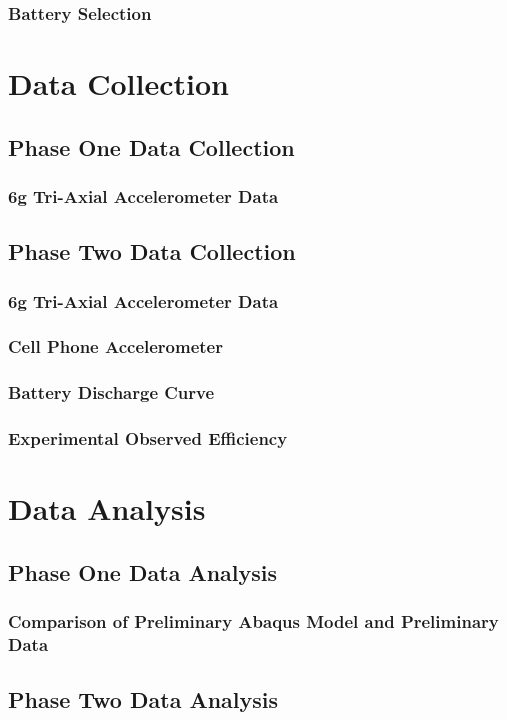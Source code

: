 \documentclass[12pt]{report}
\begin{document}
		\subsection{Battery Selection}
		
\chapter{Data Collection}
	\section{Phase One Data Collection}
		\subsection{6g Tri-Axial Accelerometer Data}
	\section{Phase Two Data Collection}
		\subsection{6g Tri-Axial Accelerometer Data}
		\subsection{Cell Phone Accelerometer}
		\subsection{Battery Discharge Curve}
		\subsection{Experimental Observed Efficiency}
\chapter{Data Analysis}
	\section{Phase One Data Analysis}
		\subsection{Comparison of Preliminary Abaqus Model and Preliminary Data}
	\section{Phase Two Data Analysis}
\end{document}
